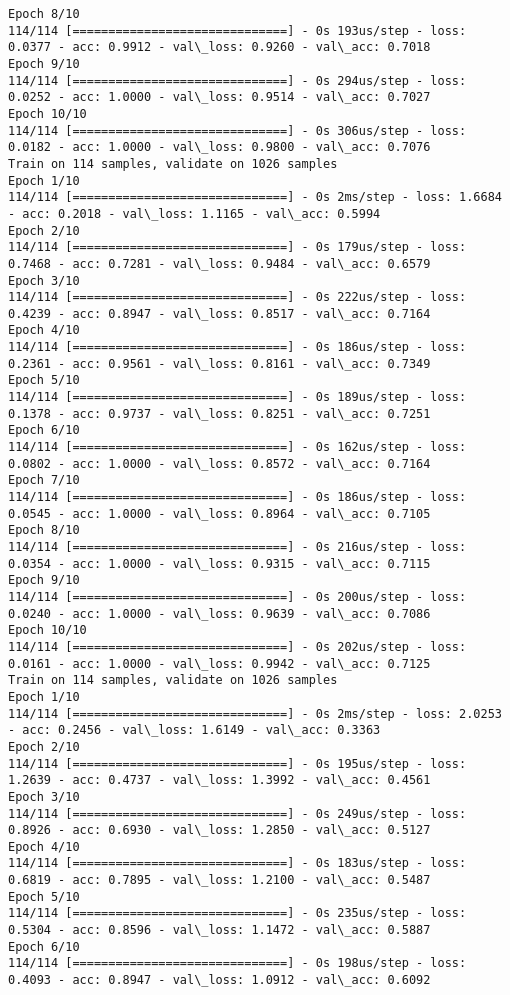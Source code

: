 \documentclass[11pt]{article}
\begin{document}
\begin{Verbatim}[commandchars=\\\{\}]
Epoch 8/10
114/114 [==============================] - 0s 193us/step - loss: 0.0377 - acc: 0.9912 - val\_loss: 0.9260 - val\_acc: 0.7018
Epoch 9/10
114/114 [==============================] - 0s 294us/step - loss: 0.0252 - acc: 1.0000 - val\_loss: 0.9514 - val\_acc: 0.7027
Epoch 10/10
114/114 [==============================] - 0s 306us/step - loss: 0.0182 - acc: 1.0000 - val\_loss: 0.9800 - val\_acc: 0.7076
Train on 114 samples, validate on 1026 samples
Epoch 1/10
114/114 [==============================] - 0s 2ms/step - loss: 1.6684 - acc: 0.2018 - val\_loss: 1.1165 - val\_acc: 0.5994
Epoch 2/10
114/114 [==============================] - 0s 179us/step - loss: 0.7468 - acc: 0.7281 - val\_loss: 0.9484 - val\_acc: 0.6579
Epoch 3/10
114/114 [==============================] - 0s 222us/step - loss: 0.4239 - acc: 0.8947 - val\_loss: 0.8517 - val\_acc: 0.7164
Epoch 4/10
114/114 [==============================] - 0s 186us/step - loss: 0.2361 - acc: 0.9561 - val\_loss: 0.8161 - val\_acc: 0.7349
Epoch 5/10
114/114 [==============================] - 0s 189us/step - loss: 0.1378 - acc: 0.9737 - val\_loss: 0.8251 - val\_acc: 0.7251
Epoch 6/10
114/114 [==============================] - 0s 162us/step - loss: 0.0802 - acc: 1.0000 - val\_loss: 0.8572 - val\_acc: 0.7164
Epoch 7/10
114/114 [==============================] - 0s 186us/step - loss: 0.0545 - acc: 1.0000 - val\_loss: 0.8964 - val\_acc: 0.7105
Epoch 8/10
114/114 [==============================] - 0s 216us/step - loss: 0.0354 - acc: 1.0000 - val\_loss: 0.9315 - val\_acc: 0.7115
Epoch 9/10
114/114 [==============================] - 0s 200us/step - loss: 0.0240 - acc: 1.0000 - val\_loss: 0.9639 - val\_acc: 0.7086
Epoch 10/10
114/114 [==============================] - 0s 202us/step - loss: 0.0161 - acc: 1.0000 - val\_loss: 0.9942 - val\_acc: 0.7125
Train on 114 samples, validate on 1026 samples
Epoch 1/10
114/114 [==============================] - 0s 2ms/step - loss: 2.0253 - acc: 0.2456 - val\_loss: 1.6149 - val\_acc: 0.3363
Epoch 2/10
114/114 [==============================] - 0s 195us/step - loss: 1.2639 - acc: 0.4737 - val\_loss: 1.3992 - val\_acc: 0.4561
Epoch 3/10
114/114 [==============================] - 0s 249us/step - loss: 0.8926 - acc: 0.6930 - val\_loss: 1.2850 - val\_acc: 0.5127
Epoch 4/10
114/114 [==============================] - 0s 183us/step - loss: 0.6819 - acc: 0.7895 - val\_loss: 1.2100 - val\_acc: 0.5487
Epoch 5/10
114/114 [==============================] - 0s 235us/step - loss: 0.5304 - acc: 0.8596 - val\_loss: 1.1472 - val\_acc: 0.5887
Epoch 6/10
114/114 [==============================] - 0s 198us/step - loss: 0.4093 - acc: 0.8947 - val\_loss: 1.0912 - val\_acc: 0.6092

\end{Verbatim}
\end{document}
